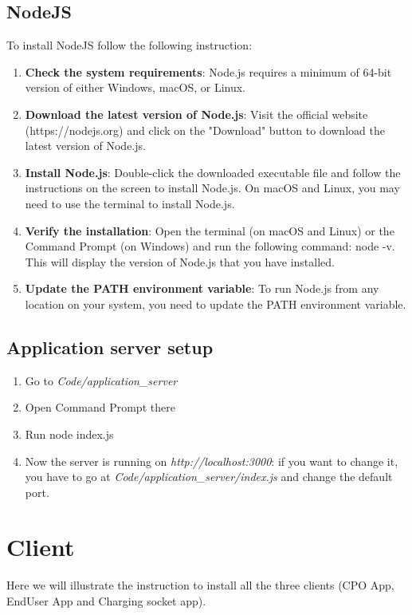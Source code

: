 \subsection{NodeJS}
To install NodeJS follow the following instruction:
\begin{enumerate}
    \item \textbf{Check the system requirements}: Node.js requires a minimum of 64-bit version of either Windows, macOS, or Linux.
    \item \textbf{Download the latest version of Node.js}: Visit the official website (https://nodejs.org) and click on the "Download" button to download the latest version of Node.js.
    \item \textbf{Install Node.js}: Double-click the downloaded executable file and follow the instructions on the screen to install Node.js. On macOS and Linux, you may need to use the terminal to install Node.js.
    \item \textbf{Verify the installation}: Open the terminal (on macOS and Linux) or the Command Prompt (on Windows) and run the following command: node -v. This will display the version of Node.js that you have installed.
    \item \textbf{Update the PATH environment variable}: To run Node.js from any location on your system, you need to update the PATH environment variable.
\end{enumerate}
\subsection{Application server setup}
\begin{enumerate}
    \item Go to \emph{Code/application\_server}
    \item Open Command Prompt there
    \item Run node index.js
    \item Now the server is running on \emph{http://localhost:3000}: if you want to change it, you have to go at \emph{Code/application\_server/index.js} and change the default port.
\end{enumerate}
\section{Client}
Here we will illustrate the instruction to install all the three clients (CPO App, EndUser App and Charging socket app).
